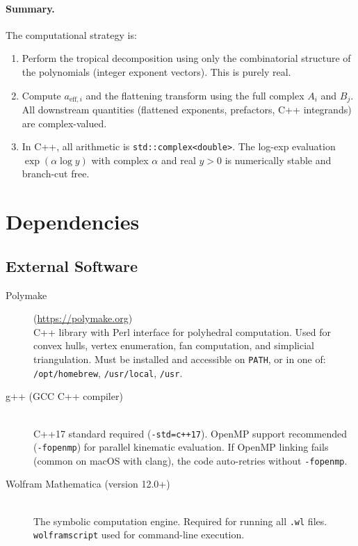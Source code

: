 \documentclass[11pt,a4paper]{article}
\begin{document}
\paragraph{Summary.}
The computational strategy is:
\begin{enumerate}
  \item Perform the tropical decomposition using only the combinatorial
        structure of the polynomials (integer exponent vectors). This is
        purely real.
  \item Compute $a_{\mathrm{eff},i}$ and the flattening transform using the full complex
        $A_i$ and $B_j$. All downstream quantities (flattened exponents,
        prefactors, C++ integrands) are complex-valued.
  \item In C++, all arithmetic is \texttt{std::complex<double>}. The log-exp
        evaluation $\exp(\alpha \log y)$ with complex $\alpha$ and real $y > 0$
        is numerically stable and branch-cut free.
\end{enumerate}

\section{Dependencies}

\subsection{External Software}

\begin{description}
  \item[Polymake] (\url{https://polymake.org}) \\
    C++ library with Perl interface for polyhedral computation. Used for convex hulls, vertex enumeration, fan computation, and simplicial triangulation. Must be installed and accessible on \texttt{PATH}, or in one of: \texttt{/opt/homebrew}, \texttt{/usr/local}, \texttt{/usr}.

  \item[g++ (GCC C++ compiler)] ~\\
    C++17 standard required (\texttt{-std=c++17}). OpenMP support recommended (\texttt{-fopenmp}) for parallel kinematic evaluation. If OpenMP linking fails (common on macOS with clang), the code auto-retries without \texttt{-fopenmp}.

  \item[Wolfram Mathematica (version 12.0+)] ~\\
    The symbolic computation engine. Required for running all \texttt{.wl} files. \texttt{wolframscript} used for command-line execution.
\end{description}
\end{document}
